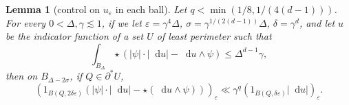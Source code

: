 \documentclass[reqno,10pt]{amsart}
\newcommand*\dif{\mathop{}\!\mathrm{d}}
\newtheorem{lemma}[theorem]{Lemma}
\theoremstyle{definition}
\numberwithin{equation}{section}
\begin{document}
\begin{lemma}[control on $u_\varepsilon$ in each ball]\label{mollifier sublemma}
Let $q < \min(1/8, 1/(4(d - 1)))$.
For every $0 < \Delta, \gamma \lesssim 1$, if we let $\varepsilon = \gamma^4 \Delta$, $\sigma = \gamma^{1/(2(d - 1))} \Delta$, $\delta = \gamma^d$, and let $u$ be the indicator function of a set $U$ of least perimeter such that
\begin{equation}\label{hypothesis on mollifier sublemma}
\int_{B_\Delta} \star(|\psi| \cdot |\dif u| - \dif u \wedge \psi) \leq \Delta^{d - 1} \gamma,
\end{equation}
then on $B_{\Delta - 2\sigma}$, if $Q \in \partial^* U$,
$$(1_{B(Q, 2\delta\varepsilon)}(|\psi| \cdot |\dif u| - \star(\dif u \wedge \psi)))_\varepsilon \ll \gamma^q (1_{B(Q, \delta\varepsilon)} |\dif u|)_\varepsilon.$$
\end{lemma}
\end{document}

